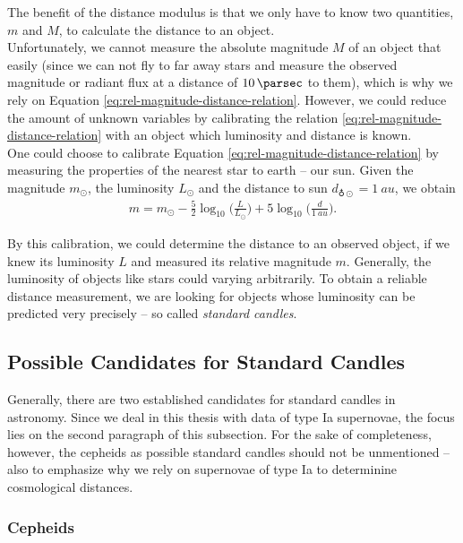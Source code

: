 The benefit of the distance modulus is that we only have to know two quantities, $m$ and $M$, to calculate the distance to an object. \\
Unfortunately, we cannot measure the absolute magnitude $M$ of an object that easily (since we can not fly to far away stars and measure the observed magnitude or radiant flux at a distance of $\SI{10}{\parsec}$ to them), which is why we rely on Equation \eqref{eq:rel-magnitude-distance-relation}.
However, we could reduce the amount of unknown variables by calibrating the relation \eqref{eq:rel-magnitude-distance-relation} with an object which luminosity and distance is known. \\

\noindent One could choose to calibrate Equation \eqref{eq:rel-magnitude-distance-relation} by measuring the properties of the nearest star to earth -- our sun. Given the magnitude $m_{\odot}$, the luminosity $L_{\odot}$ and the distance to sun $d_{\earth \odot} = \SI{1}{au}$, we obtain 
\begin{align}
    m = m_{\odot} - \frac{5}{2} \log_{10} \biggl(\frac{L}{L_{\odot}}\biggr) + 5 \log_{10} \biggl(\frac{d}{\SI{1}{au}}\biggr). 
\end{align}

\noindent By this calibration, we could determine the distance to an observed object, if we knew its luminosity $L$ and measured its relative magnitude $m$. Generally, the luminosity of objects like stars could varying arbitrarily. To obtain a reliable distance measurement, we are looking for objects whose luminosity can be predicted very precisely -- so called \textit{standard candles}. \\



\subsection{Possible Candidates for Standard Candles} 

Generally, there are two established candidates for standard candles in astronomy. Since we deal in this thesis with data of type Ia supernovae, the focus lies on the second paragraph of this subsection. For the sake of completeness, however, the cepheids as possible standard candles should not be unmentioned -- also to emphasize why we rely on supernovae of type Ia to determinine cosmological distances.

\subsubsection{Cepheids}

